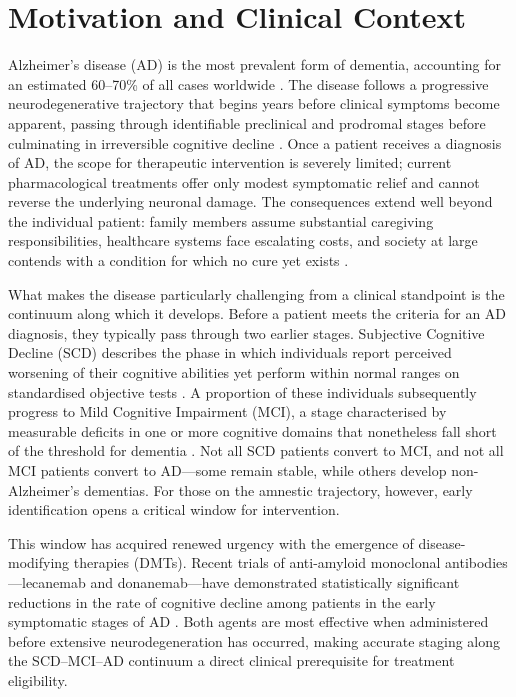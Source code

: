 \documentclass[12pt, a4paper]{report}
\begin{document}
  \section{Motivation and Clinical Context}
  \label{sec:motivation}

  Alzheimer's disease (AD) is the most prevalent form of dementia, accounting for
  an estimated 60--70\% of all cases worldwide \citep{who2023dementia}. The disease
  follows a progressive neurodegenerative trajectory that begins years before clinical
  symptoms become apparent, passing through identifiable preclinical and prodromal
  stages before culminating in irreversible cognitive decline \citep{jack2018nia}.
  Once a patient receives a diagnosis of AD, the scope for therapeutic intervention
  is severely limited; current pharmacological treatments offer only modest symptomatic
  relief and cannot reverse the underlying neuronal damage. The consequences extend
  well beyond the individual patient: family members assume substantial caregiving
  responsibilities, healthcare systems face escalating costs, and society at large
  contends with a condition for which no cure yet exists \citep{wimo2017costs}.

  What makes the disease particularly challenging from a clinical standpoint is the
  continuum along which it develops. Before a patient meets the criteria for an AD
  diagnosis, they typically pass through two earlier stages. Subjective Cognitive
  Decline (SCD) describes the phase in which individuals report perceived worsening
  of their cognitive abilities yet perform within normal ranges on standardised
  objective tests \citep{jessen2014scd}. A proportion of these individuals
  subsequently progress to Mild Cognitive Impairment (MCI), a stage characterised by
  measurable deficits in one or more cognitive domains that nonetheless fall short of
  the threshold for dementia \citep{albert2011mci}. Not all SCD patients convert to
  MCI, and not all MCI patients convert to AD---some remain stable, while others
  develop non-Alzheimer's dementias. For those on the amnestic trajectory, however,
  early identification opens a critical window for intervention.

  This window has acquired renewed urgency with the emergence of disease-modifying
  therapies (DMTs). Recent trials of anti-amyloid monoclonal antibodies---lecanemab
  and donanemab---have demonstrated statistically significant reductions in the rate
  of cognitive decline among patients in the early symptomatic stages of AD
  \citep{vandyck2023lecanemab, sims2023donanemab}. Both agents are most effective
  when administered before extensive neurodegeneration has occurred, making accurate
  staging along the SCD--MCI--AD continuum a direct clinical prerequisite for
  treatment eligibility.
\end{document}
